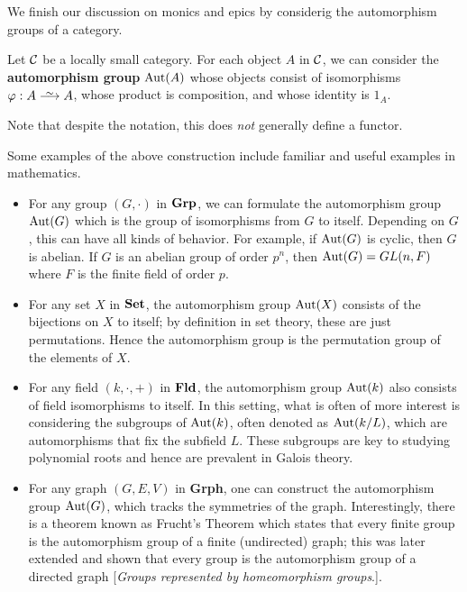     We finish our discussion on monics and epics by considerig the automorphism groups 
    of a category. 

    \begin{definition}
        Let $\mathcal{C}$ be a locally small category. For each object $A$ in $\mathcal{C}$, we can consider the 
        \textbf{automorphism group} $\operatorname{\mathrm{Aut}}(A)$ whose objects consist of isomorphisms 
        $\phi: A \isomarrow A$, whose product is composition, and whose identity is $1_A$. 
    \end{definition}

    Note that despite the notation, this does \emph{not} generally define a functor. 

    \begin{example}
        Some examples of the above construction include familiar and useful examples 
        in mathematics.
        \begin{itemize}[itemsep=0.5cm]
            \item  For any group $(G, \cdot)$ in $\operatorname{\mathbf{Grp}}$, we can formulate the automorphism 
            group $\operatorname{\mathrm{Aut}}(G)$ which is the group of isomorphisms from $G$ to itself. 
            Depending on $G$, this can have all kinds of behavior. For example, if 
            $\operatorname{\mathrm{Aut}}(G)$ is cyclic, then 
            $G$ is abelian. If $G$ is an abelian group 
            of order $p^n$, then $\operatorname{\mathrm{Aut}}(G) = GL(n, F)$ where $F$ is the finite field of order $p$.
    
            \item For any set $X$ in $\operatorname{\mathbf{Set}}$, the automorphism group $\operatorname{\mathrm{Aut}}(X)$ consists of the bijections 
            on $X$ to itself; by definition in set theory, these are just permutations. Hence the automorphism group 
            is the permutation group of the elements of $X$. 
    
            \item For any field $(k, \cdot, +)$ in $\operatorname{\mathbf{Fld}}$, the automorphism 
            group $\operatorname{\mathrm{Aut}}(k)$ also consists of field isomorphisms to itself. 
            In this setting, what is often 
            of more interest is considering the subgroups of $\operatorname{\mathrm{Aut}}(k)$, often 
            denoted as $\operatorname{\mathrm{Aut}}(k/L)$, which are automorphisms that fix the subfield 
            $L$. These subgroups are key 
            to studying polynomial roots and hence are prevalent in Galois theory.
    
            \item For any graph $(G, E, V)$ in \textbf{Grph}, one can construct the automorphism group $\operatorname{\mathrm{Aut}}(G)$, 
            which tracks the symmetries of the graph. Interestingly, there is a theorem known as 
            Frucht's Theorem which states that every finite 
            group is the automorphism group of a finite (undirected) graph; this was later 
            extended and shown that every group is the automorphism group of a directed 
            graph [\emph{Groups represented by homeomorphism groups}.]. 
    

\end{itemize}
\end{example}
